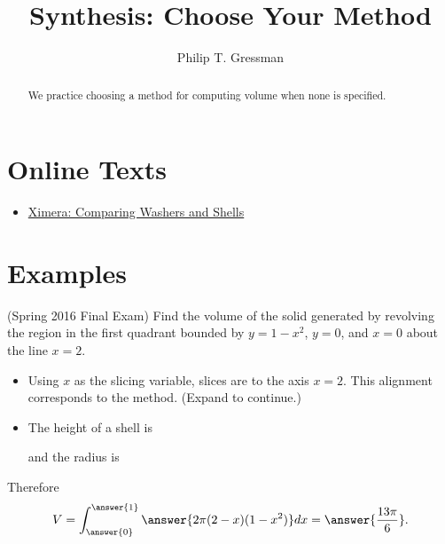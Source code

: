 \documentclass{ximera}
\title{Synthesis: Choose Your Method}
\author{Philip T. Gressman}
\begin{document}
\begin{abstract}
We practice choosing a method for computing volume when none is specified.
\end{abstract}
\maketitle

\section*{Online Texts}
\begin{itemize}
\item \href{https://ximera.osu.edu/mooculus/calculus2/solidsOfRevolution/digInComparingWasherAndShellMethod}{Ximera: Comparing Washers and Shells}
\end{itemize}

\section*{Examples}

\begin{example}
(Spring 2016 Final Exam) Find the volume of the solid generated by revolving the region in the first quadrant bounded by $y = 1-x^2$, $y = 0$, and $x = 0$ about the line $x=2$.
\begin{itemize}
\item Using $x$ as the slicing variable, slices are  to the axis $x=2$. This alignment corresponds to the  method.
(Expand to continue.)
\end{itemize}
\begin{expandable}
\begin{itemize}
\item The height of a shell is 
\begin{multipleChoice}
\end{multipleChoice}
and the radius is
\begin{multipleChoice}
\end{multipleChoice}
\end{itemize}
Therefore
\[ V = \int_{\answer{0}}^{\answer{1}} \answer{2 \pi (2-x)(1-x^2)} dx = \answer{\frac{13 \pi}{6}}. \]
\end{expandable}
\end{example}
\end{document}
